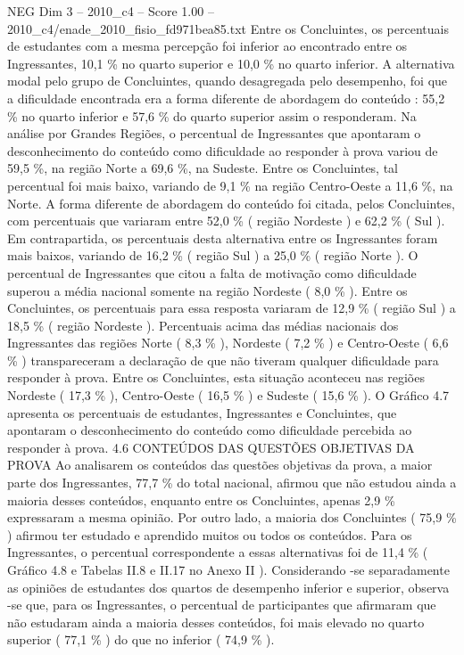 \begin{textsample}{NEG Dim 3 – 2010\_c4 – Score 1.00 – 2010\_c4/enade\_2010\_fisio\_fd971bea85.txt}
Entre os Concluintes, os percentuais de estudantes com a mesma percepção foi inferior ao encontrado entre os Ingressantes, 10,1 \% no quarto superior e 10,0 \% no quarto inferior.
A alternativa modal pelo grupo de Concluintes, quando desagregada pelo desempenho, foi que a dificuldade encontrada era a forma diferente de abordagem do conteúdo : 55,2 \% no quarto inferior e 57,6 \% do quarto superior assim o responderam.
Na análise por Grandes Regiões, o percentual de Ingressantes que apontaram o desconhecimento do conteúdo como dificuldade ao responder à prova variou de 59,5 \%, na região Norte a 69,6 \%, na Sudeste.
Entre os Concluintes, tal percentual foi mais baixo, variando de 9,1 \% na região Centro-Oeste a 11,6 \%, na Norte.
A forma diferente de abordagem do conteúdo foi citada, pelos Concluintes, com percentuais que variaram entre 52,0 \% ( região Nordeste ) e 62,2 \% ( Sul ).
Em contrapartida, os percentuais desta alternativa entre os Ingressantes foram mais baixos, variando de 16,2 \% ( região Sul ) a 25,0 \% ( região Norte ).
O percentual de Ingressantes que citou a falta de motivação como dificuldade superou a média nacional somente na região Nordeste ( 8,0 \% ).
Entre os Concluintes, os percentuais para essa resposta variaram de 12,9 \% ( região Sul ) a 18,5 \% ( região Nordeste ).
Percentuais acima das médias nacionais dos Ingressantes das regiões Norte ( 8,3 \% ), Nordeste ( 7,2 \% ) e Centro-Oeste ( 6,6 \% ) transpareceram a declaração de que não tiveram qualquer dificuldade para responder à prova.
Entre os Concluintes, esta situação aconteceu nas regiões Nordeste ( 17,3 \% ), Centro-Oeste ( 16,5 \% ) e Sudeste ( 15,6 \% ).
O Gráfico 4.7 apresenta os percentuais de estudantes, Ingressantes e Concluintes, que apontaram o desconhecimento do conteúdo como dificuldade percebida ao responder à prova. 4.6 CONTEÚDOS DAS QUESTÕES OBJETIVAS DA PROVA Ao analisarem os conteúdos das questões objetivas da prova, a maior parte dos Ingressantes, 77,7 \% do total nacional, afirmou que não estudou ainda a maioria desses conteúdos, enquanto entre os Concluintes, apenas 2,9 \% expressaram a mesma opinião.
Por outro lado, a maioria dos Concluintes ( 75,9 \% ) afirmou ter estudado e aprendido muitos ou todos os conteúdos.
Para os Ingressantes, o percentual correspondente a essas alternativas foi de 11,4 \% ( Gráfico 4.8 e Tabelas II.8 e II.17 no Anexo II ).
Considerando -se separadamente as opiniões de estudantes dos quartos de desempenho inferior e superior, observa -se que, para os Ingressantes, o percentual de participantes que afirmaram que não estudaram ainda a maioria desses conteúdos, foi mais elevado no quarto superior ( 77,1 \% ) do que no inferior ( 74,9 \% ).

\end{textsample}
